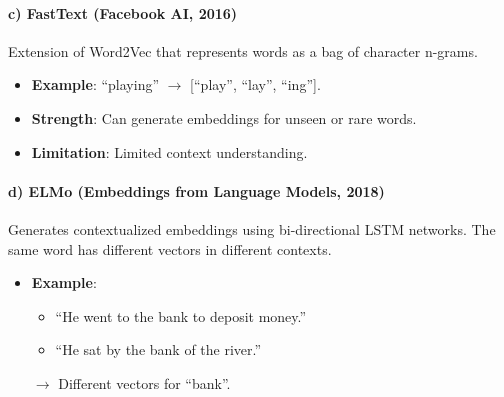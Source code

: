 \documentclass[12pt,a4paper]{article}
\begin{document}
\paragraph{c) FastText (Facebook AI, 2016)}
Extension of Word2Vec that represents words as a bag of character n-grams.
\begin{itemize}
    \item \textbf{Example}: ``playing'' $\rightarrow$ [``play'', ``lay'', ``ing''].
    \item \textbf{Strength}: Can generate embeddings for unseen or rare words.
    \item \textbf{Limitation}: Limited context understanding.
\end{itemize}

\paragraph{d) ELMo (Embeddings from Language Models, 2018)}
Generates contextualized embeddings using bi-directional LSTM networks. The same word has different vectors in different contexts.
\begin{itemize}
    \item \textbf{Example}:
    \begin{itemize}
        \item ``He went to the bank to deposit money.''
        \item ``He sat by the bank of the river.''
    \end{itemize}
    $\rightarrow$ Different vectors for ``bank''.
\end{itemize}
\end{document}
